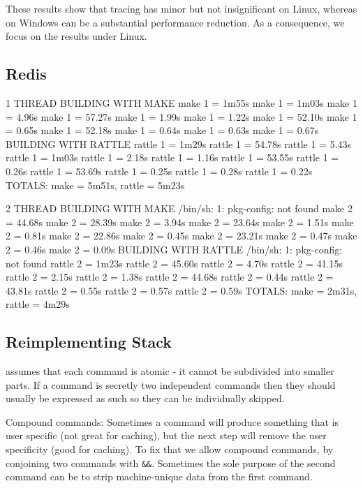 \postparagrahs

These results show that tracing has minor but not insignificant on Linux, whereas on Windows can be a substantial performance reduction. As a consequence, we focus on the results under Linux.

\subsection{Redis}

1 THREAD
BUILDING WITH MAKE
make 1 = 1m55s
make 1 = 1m03s
make 1 = 4.96s
make 1 = 57.27s
make 1 = 1.99s
make 1 = 1.22s
make 1 = 52.10s
make 1 = 0.65s
make 1 = 52.18s
make 1 = 0.64s
make 1 = 0.63s
make 1 = 0.67s
BUILDING WITH RATTLE
rattle 1 = 1m29s
rattle 1 = 54.78s
rattle 1 = 5.43s
rattle 1 = 1m03s
rattle 1 = 2.18s
rattle 1 = 1.16s
rattle 1 = 53.55s
rattle 1 = 0.26s
rattle 1 = 53.69s
rattle 1 = 0.25s
rattle 1 = 0.28s
rattle 1 = 0.22s
TOTALS: make = 5m51s, rattle = 5m23s

2 THREAD
BUILDING WITH MAKE
/bin/sh: 1: pkg-config: not found
make 2 = 44.68s
make 2 = 28.39s
make 2 = 3.94s
make 2 = 23.64s
make 2 = 1.51s
make 2 = 0.81s
make 2 = 22.86s
make 2 = 0.45s
make 2 = 23.21s
make 2 = 0.47s
make 2 = 0.46s
make 2 = 0.09s
BUILDING WITH RATTLE
/bin/sh: 1: pkg-config: not found
rattle 2 = 1m23s
rattle 2 = 45.60s
rattle 2 = 4.70s
rattle 2 = 41.15s
rattle 2 = 2.15s
rattle 2 = 1.38s
rattle 2 = 44.68s
rattle 2 = 0.44s
rattle 2 = 43.81s
rattle 2 = 0.55s
rattle 2 = 0.57s
rattle 2 = 0.59s
TOTALS: make = 2m31s, rattle = 4m29s



\subsection{Reimplementing Stack}

\Rattle assumes that each command is atomic - it cannot be subdivided into smaller parts. If a command is secretly two independent commands then they should usually be expressed as such so they can be individually skipped.

Compound commands: Sometimes a command will produce something that is user specific (not great for caching), but the next step will remove the user specificity (good for caching). To fix that we allow compound commands, by conjoining two commands with \texttt{\&\&}. Sometimes the sole purpose of the second command can be to strip machine-unique data from the first command.

